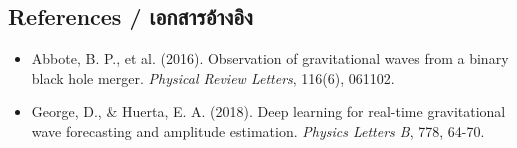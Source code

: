 \subsection{References \quad / \quad \textthai{เอกสารอ้างอิง}}
\begin{itemize}
    \item Abbote, B. P., et al. (2016). Observation of gravitational waves from a binary black hole merger. \textit{Physical Review Letters}, 116(6), 061102.
    \item George, D., \& Huerta, E. A. (2018). Deep learning for real-time gravitational wave forecasting and amplitude estimation. \textit{Physics Letters B}, 778, 64-70.
\end{itemize}
